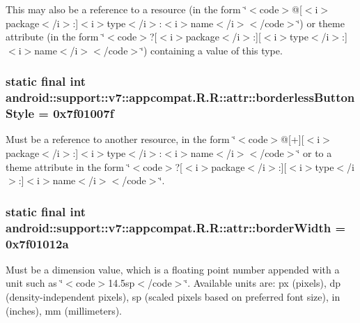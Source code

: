 This may also be a reference to a resource (in the form \char`\"{}$<$code$>$@\mbox{[}$<$i$>$package$<$/i$>$:\mbox{]}$<$i$>$type$<$/i$>$:$<$i$>$name$<$/i$>$$<$/code$>$\char`\"{}) or theme attribute (in the form \char`\"{}$<$code$>$?\mbox{[}$<$i$>$package$<$/i$>$:\mbox{]}\mbox{[}$<$i$>$type$<$/i$>$:\mbox{]}$<$i$>$name$<$/i$>$$<$/code$>$\char`\"{}) containing a value of this type. \hypertarget{classandroid_1_1support_1_1v7_1_1appcompat_1_1_r_1_1attr_a708bbe5adb93624dc76297b747c5785}{
\subsubsection[{borderlessButtonStyle}]{\setlength{\rightskip}{0pt plus 5cm}static final int android::support::v7::appcompat.R.R::attr::borderlessButtonStyle = 0x7f01007f}}
\label{classandroid_1_1support_1_1v7_1_1appcompat_1_1_r_1_1attr_a708bbe5adb93624dc76297b747c5785}


Must be a reference to another resource, in the form \char`\"{}$<$code$>$@\mbox{[}+\mbox{]}\mbox{[}$<$i$>$package$<$/i$>$:\mbox{]}$<$i$>$type$<$/i$>$:$<$i$>$name$<$/i$>$$<$/code$>$\char`\"{} or to a theme attribute in the form \char`\"{}$<$code$>$?\mbox{[}$<$i$>$package$<$/i$>$:\mbox{]}\mbox{[}$<$i$>$type$<$/i$>$:\mbox{]}$<$i$>$name$<$/i$>$$<$/code$>$\char`\"{}. \hypertarget{classandroid_1_1support_1_1v7_1_1appcompat_1_1_r_1_1attr_772d81c0a2c8e47ba1a1bd9686096d00}{
\subsubsection[{borderWidth}]{\setlength{\rightskip}{0pt plus 5cm}static final int android::support::v7::appcompat.R.R::attr::borderWidth = 0x7f01012a}}
\label{classandroid_1_1support_1_1v7_1_1appcompat_1_1_r_1_1attr_772d81c0a2c8e47ba1a1bd9686096d00}


Must be a dimension value, which is a floating point number appended with a unit such as \char`\"{}$<$code$>$14.5sp$<$/code$>$\char`\"{}. Available units are: px (pixels), dp (density-independent pixels), sp (scaled pixels based on preferred font size), in (inches), mm (millimeters). 

